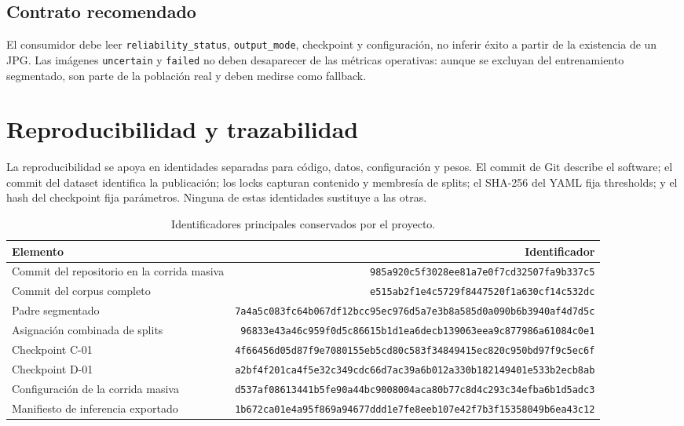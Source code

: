 \documentclass[11pt,a4paper]{article}
\begin{document}
\subsection{Contrato recomendado}

El consumidor debe leer \texttt{reliability\_status}, \texttt{output\_mode}, checkpoint y configuración, no inferir éxito a partir de la existencia de un JPG. Las imágenes \texttt{uncertain} y \texttt{failed} no deben desaparecer de las métricas operativas: aunque se excluyan del entrenamiento segmentado, son parte de la población real y deben medirse como fallback.


\section{Reproducibilidad y trazabilidad}

La reproducibilidad se apoya en identidades separadas para código, datos, configuración y pesos. El commit de Git describe el software; el commit del dataset identifica la publicación; los locks capturan contenido y membresía de splits; el SHA-256 del YAML fija thresholds; y el hash del checkpoint fija parámetros. Ninguna de estas identidades sustituye a las otras.


\begin{table}[H]
\centering
\caption{Identificadores principales conservados por el proyecto.}
\small
\begin{tabular}{lr}
\toprule
Elemento & Identificador \\
\midrule
Commit del repositorio en la corrida masiva & \texttt{985a920c5f3028ee81a7e0f7cd32507fa9b337c5} \\
Commit del corpus completo & \texttt{e515ab2f1e4c5729f8447520f1a630cf14c532dc} \\
Padre segmentado & \texttt{7a4a5c083fc64b067df12bcc95ec976d5a7e3b8a585d0a090b6b3940af4d7d5c} \\
Asignación combinada de splits & \texttt{96833e43a46c959f0d5c86615b1d1ea6decb139063eea9c877986a61084c0e1} \\
Checkpoint C-01 & \texttt{4f66456d05d87f9e7080155eb5cd80c583f34849415ec820c950bd97f9c5ec6f} \\
Checkpoint D-01 & \texttt{a2bf4f201ca4f5e32c349cdc66d7ac39a6b012a330b182149401e533b2ecb8ab} \\
Configuración de la corrida masiva & \texttt{d537af08613441b5fe90a44bc9008004aca80b77c8d4c293c34efba6b1d5adc3} \\
Manifiesto de inferencia exportado & \texttt{1b672ca01e4a95f869a94677ddd1e7fe8eeb107e42f7b3f15358049b6ea43c12} \\
\bottomrule
\end{tabular}
\end{table}
\end{document}
